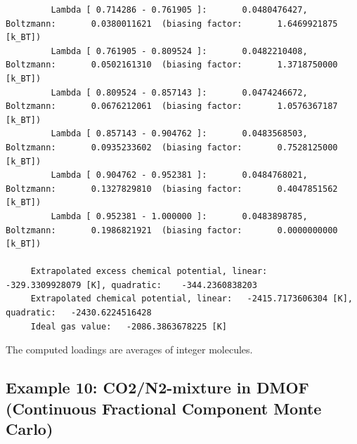 \begin{tiny}
\begin{verbatim}
         Lambda [ 0.714286 - 0.761905 ]:       0.0480476427, Boltzmann:       0.0380011621  (biasing factor:       1.6469921875 [k_BT])
         Lambda [ 0.761905 - 0.809524 ]:       0.0482210408, Boltzmann:       0.0502161310  (biasing factor:       1.3718750000 [k_BT])
         Lambda [ 0.809524 - 0.857143 ]:       0.0474246672, Boltzmann:       0.0676212061  (biasing factor:       1.0576367187 [k_BT])
         Lambda [ 0.857143 - 0.904762 ]:       0.0483568503, Boltzmann:       0.0935233602  (biasing factor:       0.7528125000 [k_BT])
         Lambda [ 0.904762 - 0.952381 ]:       0.0484768021, Boltzmann:       0.1327829810  (biasing factor:       0.4047851562 [k_BT])
         Lambda [ 0.952381 - 1.000000 ]:       0.0483898785, Boltzmann:       0.1986821921  (biasing factor:       0.0000000000 [k_BT])
     
     Extrapolated excess chemical potential, linear:    -329.3309928079 [K], quadratic:    -344.2360838203
     Extrapolated chemical potential, linear:   -2415.7173606304 [K], quadratic:   -2430.6224516428
     Ideal gas value:   -2086.3863678225 [K]
\end{verbatim}
\end{tiny}

The computed loadings are averages of integer molecules.

\subsection*{Example 10: CO2/N2-mixture in DMOF (Continuous Fractional Component Monte Carlo)}

